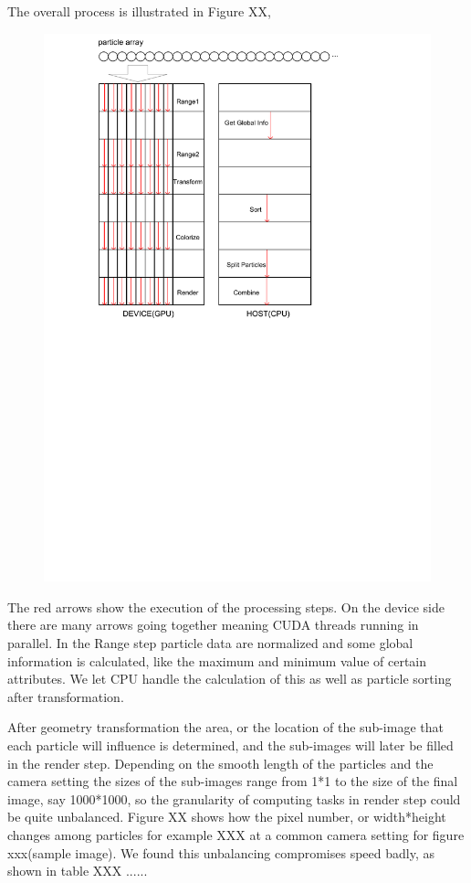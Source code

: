 The overall process is illustrated in Figure XX,
\begin{figure}
\begin{center}
\includegraphics[width=1.3\textwidth]{cu_splotch_process.pdf}
\end{center}
\end{figure}
The red arrows show the execution of the processing steps. On the device side there are many arrows going together meaning CUDA threads running in parallel. In the Range step particle data are normalized and some global information is calculated, like the maximum and minimum value of certain attributes. We let CPU handle the calculation of this as well as particle sorting after transformation.

After geometry transformation the area, or the location of the sub-image that each particle will influence is determined, and the sub-images will later be filled in the render step. Depending on the smooth length of the particles and the camera setting the sizes of the sub-images range from 1*1 to the size of the final image, say 1000*1000, so the granularity of computing tasks in render step could be quite unbalanced. Figure XX shows how the pixel number, or width*height changes among particles for example XXX at a common camera setting for figure xxx(sample image). We found this unbalancing compromises speed badly, as shown in table XXX ......

